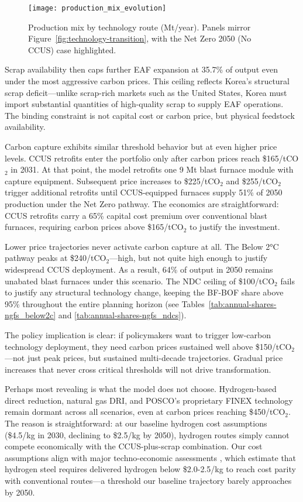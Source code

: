 \begin{figure}[!t]
  \centering
  \texttt{[image: production\_mix\_evolution]}
  \caption{Production mix by technology route (Mt/year). Panels mirror Figure~\ref{fig:technology-transition}, with the Net Zero 2050 (No CCUS) case highlighted.}
  \label{fig:production-mix}
\end{figure}

Scrap availability then caps further EAF expansion at 35.7\% of output even under the most aggressive carbon prices. This ceiling reflects Korea's structural scrap deficit—unlike scrap-rich markets such as the United States, Korea must import substantial quantities of high-quality scrap to supply EAF operations. The binding constraint is not capital cost or carbon price, but physical feedstock availability.

Carbon capture exhibits similar threshold behavior but at even higher price levels. CCUS retrofits enter the portfolio only after carbon prices reach \$165/tCO$_2$ in 2031. At that point, the model retrofits one 9 Mt blast furnace module with capture equipment. Subsequent price increases to \$225/tCO$_2$ and \$255/tCO$_2$ trigger additional retrofits until CCUS-equipped furnaces supply 51\% of 2050 production under the Net Zero pathway. The economics are straightforward: CCUS retrofits carry a 65\% capital cost premium over conventional blast furnaces, requiring carbon prices above \$165/tCO$_2$ to justify the investment.

Lower price trajectories never activate carbon capture at all. The Below 2°C pathway peaks at \$240/tCO$_2$—high, but not quite high enough to justify widespread CCUS deployment. As a result, 64\% of output in 2050 remains unabated blast furnaces under this scenario. The NDC ceiling of \$100/tCO$_2$ fails to justify any structural technology change, keeping the BF-BOF share above 95\% throughout the entire planning horizon (see Tables~\ref{tab:annual-shares-ngfs_below2c} and \ref{tab:annual-shares-ngfs_ndcs}).

The policy implication is clear: if policymakers want to trigger low-carbon technology deployment, they need carbon prices sustained well above \$150/tCO$_2$—not just peak prices, but sustained multi-decade trajectories. Gradual price increases that never cross critical thresholds will not drive transformation.

Perhaps most revealing is what the model does not choose. Hydrogen-based direct reduction, natural gas DRI, and POSCO's proprietary FINEX technology remain dormant across all scenarios, even at carbon prices reaching \$450/tCO$_2$. The reason is straightforward: at our baseline hydrogen cost assumptions (\$4.5/kg in 2030, declining to \$2.5/kg by 2050), hydrogen routes simply cannot compete economically with the CCUS-plus-scrap combination. Our cost assumptions align with major techno-economic assessments \citep{MaterialEconomics2019,demailly2018european}, which estimate that hydrogen steel requires delivered hydrogen below \$2.0-2.5/kg to reach cost parity with conventional routes—a threshold our baseline trajectory barely approaches by 2050.

